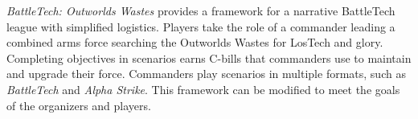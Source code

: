 \emph{BattleTech: Outworlds Wastes} provides a framework for a narrative BattleTech league with simplified logistics.
Players take the role of a commander leading a combined arms force searching the Outworlds Wastes for LosTech and glory.
Completing objectives in scenarios earns C-bills that commanders use to maintain and upgrade their force.
Commanders play scenarios in multiple formats, such as \emph{BattleTech} and \emph{Alpha Strike}.
This framework can be modified to meet the goals of the organizers and players.
